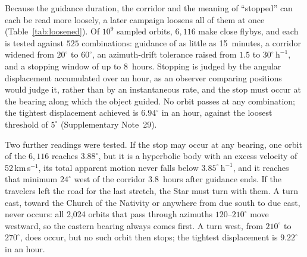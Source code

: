 \documentclass[sn-nature]{sn-jnl}
\begin{document}
Because the guidance duration, the corridor and the meaning of ``stopped''
can each be read more loosely, a later campaign loosens all of them at once
(Table~\ref{tab:loosened}). Of $10^{9}$ sampled orbits, $6{,}116$ make close
flybys, and each is tested against $525$ combinations: guidance of as little
as 15~minutes, a corridor widened from $20^\circ$ to $60^\circ$, an azimuth-drift
tolerance raised from $1.5$ to $30^\circ\,\mathrm{h}^{-1}$, and a stopping window
of up to 8~hours. Stopping is judged by the angular displacement accumulated
over an hour, as an observer comparing positions would judge it, rather than by
an instantaneous rate, and the stop must occur at the bearing along which the
object guided. No orbit passes at any combination; the tightest displacement
achieved is $6.94^\circ$ in an hour, against the loosest threshold of
$5^\circ$ (Supplementary Note~29).

Two further readings were tested. If the stop may occur at any bearing, one
orbit of the $6{,}116$ reaches $3.88^\circ$, but it is a hyperbolic body with an
excess velocity of 52\,km\,s$^{-1}$, its total apparent motion never falls below
$3.85^\circ\,\mathrm{h}^{-1}$, and it reaches that minimum $24^\circ$ west of the
corridor 3.8~hours after guidance ends. If the travelers left the road for the
last stretch, the Star must turn with them. A turn east, toward the Church of
the Nativity or anywhere from due south to due east, never occurs: all 2,024
orbits that pass through azimuths $120$--$210^\circ$ move westward, so the
eastern bearing always comes first. A turn west, from $210^\circ$ to $270^\circ$, does occur, but no
such orbit then stops; the tightest displacement is $9.22^\circ$ in an hour.
\end{document}
